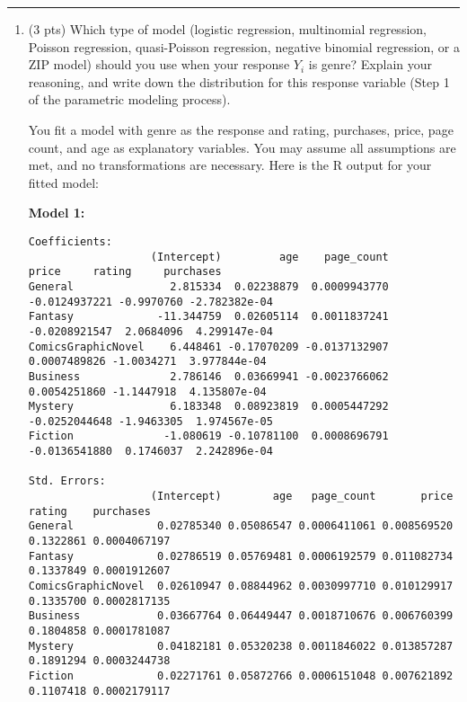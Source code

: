 \documentclass[11pt]{article}
\begin{document}
\rule{\textwidth}{1pt}

\begin{enumerate}

\item (3 pts) Which type of model (logistic regression, multinomial regression, Poisson regression, quasi-Poisson regression, negative binomial regression, or a ZIP model) should you use when your response $Y_i$ is genre? Explain your reasoning, and write down the distribution for this response variable (Step 1 of the parametric modeling process).

\newpage

You fit a model with genre as the response and rating, purchases, price, page count, and age as explanatory variables. You may assume all assumptions are met, and no transformations are necessary. Here is the R output for your fitted model:

\textbf{Model 1:}

\begin{small}
\begin{verbatim}
Coefficients:
                   (Intercept)         age    page_count         price     rating     purchases
General               2.815334  0.02238879  0.0009943770 -0.0124937221 -0.9970760 -2.782382e-04
Fantasy             -11.344759  0.02605114  0.0011837241 -0.0208921547  2.0684096  4.299147e-04
ComicsGraphicNovel    6.448461 -0.17070209 -0.0137132907  0.0007489826 -1.0034271  3.977844e-04
Business              2.786146  0.03669941 -0.0023766062  0.0054251860 -1.1447918  4.135807e-04
Mystery               6.183348  0.08923819  0.0005447292 -0.0252044648 -1.9463305  1.974567e-05
Fiction              -1.080619 -0.10781100  0.0008696791 -0.0136541880  0.1746037  2.242896e-04

Std. Errors:
                   (Intercept)        age   page_count       price    rating    purchases
General             0.02785340 0.05086547 0.0006411061 0.008569520 0.1322861 0.0004067197
Fantasy             0.02786519 0.05769481 0.0006192579 0.011082734 0.1337849 0.0001912607
ComicsGraphicNovel  0.02610947 0.08844962 0.0030997710 0.010129917 0.1335700 0.0002817135
Business            0.03667764 0.06449447 0.0018710676 0.006760399 0.1804858 0.0001781087
Mystery             0.04182181 0.05320238 0.0011846022 0.013857287 0.1891294 0.0003244738
Fiction             0.02271761 0.05872766 0.0006151048 0.007621892 0.1107418 0.0002179117
\end{verbatim}
\end{small}


\end{enumerate}
\end{document}
